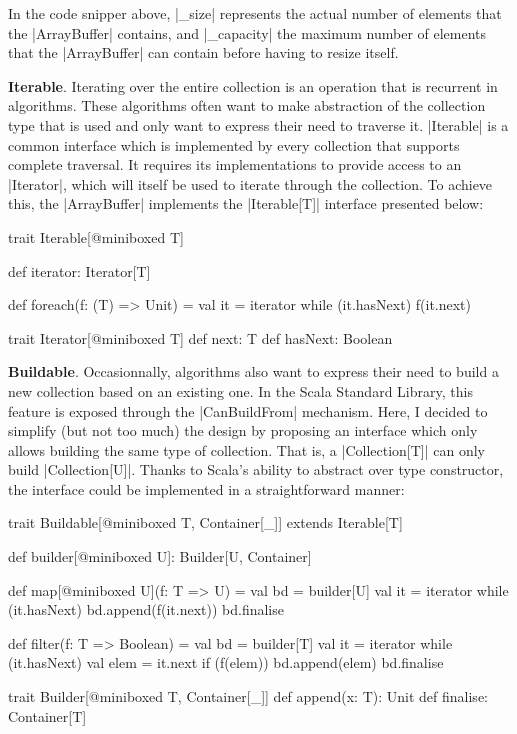 In the code snipper above, |_size| represents the actual number of elements that the |ArrayBuffer| contains, and |_capacity| the maximum number of elements that the |ArrayBuffer| can contain before having to resize itself.
 
\textbf{Iterable}. Iterating over the entire collection is an operation that is recurrent in algorithms. These algorithms often want to make abstraction of the collection type that is used and only want to express their need to traverse it. |Iterable| is a common interface which is implemented by every collection that supports complete traversal. It requires its implementations to provide access to an |Iterator|, which will itself be used to iterate through the collection. To achieve this, the |ArrayBuffer| implements the |Iterable[T]| interface presented below:

\begin{lstlisting-nobreak}
trait Iterable[@miniboxed T] {
  def iterator: Iterator[T]

  def foreach(f: (T) => Unit) = {
    val it = iterator
    while (it.hasNext) {
      f(it.next)
    }
  }
}

trait Iterator[@miniboxed T] {
  def next: T
  def hasNext: Boolean
}
\end{lstlisting-nobreak}

\textbf{Buildable}. Occasionnally, algorithms also want to express their need to build a new collection based on an existing one. In the Scala Standard Library, this feature is exposed through the |CanBuildFrom| mechanism. 
Here, I decided to simplify (but not too much) the design by proposing an interface which only allows building the same type of collection. That is, a |Collection[T]| can only build |Collection[U]|. Thanks to Scala's ability to abstract over type constructor, the interface could be implemented in a straightforward manner: 

\begin{lstlisting-nobreak}
trait Buildable[@miniboxed T, Container[_]] extends Iterable[T] {
  def builder[@miniboxed U]: Builder[U, Container]

  def map[@miniboxed U](f: T => U) = {
    val bd = builder[U]
    val it = iterator
    while (it.hasNext) {
      bd.append(f(it.next))
    }
    bd.finalise
  }

  def filter(f: T => Boolean) = {
    val bd = builder[T]
    val it = iterator
    while (it.hasNext) {
      val elem = it.next
      if (f(elem)) {
        bd.append(elem)
      }
    }
    bd.finalise
  }
}

trait Builder[@miniboxed T, Container[_]] {
  def append(x: T): Unit
  def finalise: Container[T]
}
\end{lstlisting-nobreak}

